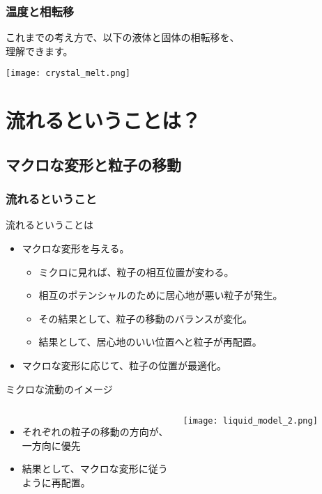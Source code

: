 \documentclass[12pt, dvipdfmx]{beamer}
\begin{document}
\begin{frame}
	\frametitle{温度と相転移}
		これまでの考え方で、以下の液体と固体の相転移を、\\理解できます。
		\begin{center}
			\texttt{[image: crystal\_melt.png]}
		\end{center}
\end{frame}

\section{流れるということは？}

\subsection{マクロな変形と粒子の移動}
\begin{frame}
	\frametitle{流れるということ}
	\begin{alertblock}{流れるということは}
		\begin{itemize}
			\item マクロな変形を与える。
			\begin{itemize}
				\item ミクロに見れば、粒子の相互位置が変わる。
				\item 相互のポテンシャルのために居心地が悪い粒子が発生。
				\item その結果として、粒子の移動のバランスが変化。
				\item 結果として、居心地のいい位置へと粒子が再配置。
			\end{itemize}
			\item マクロな変形に応じて、粒子の位置が最適化。
		\end{itemize}
	\end{alertblock}
	\begin{exampleblock}{ミクロな流動のイメージ}
		\begin{columns}[T, onlytextwidth]
			\begin{itemize}
				\item それぞれの粒子の移動の方向が、\\一方向に優先
				\item 結果として、マクロな変形に従う\\ように再配置。
			\end{itemize}
			\begin{center}
				\texttt{[image: liquid\_model\_2.png]}
			\end{center}
		\end{columns}
	\end{exampleblock}
\end{frame}
\end{document}
